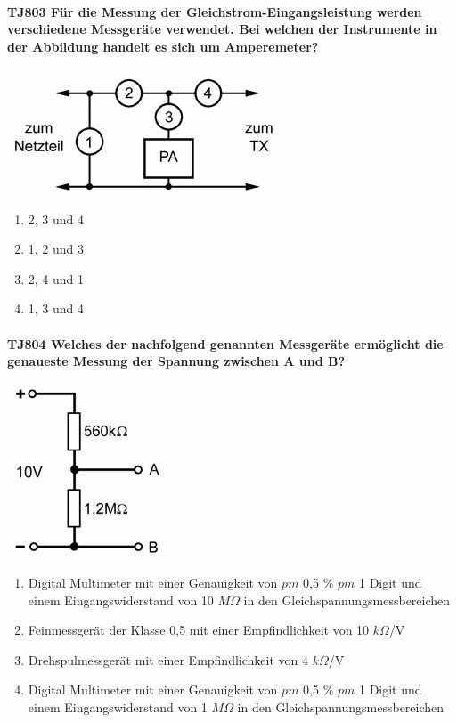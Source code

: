 \documentclass[8pt]{article}
\begin{document}
\paragraph*{TJ803 Für die Messung der Gleichstrom-Eingangsleistung werden verschiedene Messgeräte verwendet. Bei welchen der Instrumente in der Abbildung handelt es sich um Amperemeter?}
\begin{center}
	\begin{minipage}{\linewidth}
		\centering
		\includegraphics[scale=1.0]{pics/tj803_a.jpg}
	\end{minipage}
\end{center}
\begin{enumerate}[nolistsep,label=\Alph*]
\item 2, 3 und 4
\item 1, 2 und 3
\item 2, 4 und 1
\item 1, 3 und 4
\end{enumerate}

\paragraph*{TJ804 Welches der nachfolgend genannten Messgeräte ermöglicht die genaueste Messung der Spannung zwischen A und B?}
\begin{center}
	\begin{minipage}{\linewidth}
		\centering
		\includegraphics[scale=1.0]{pics/tj804_a.jpg}
	\end{minipage}
\end{center}
\begin{enumerate}[nolistsep,label=\Alph*]
\item Digital Multimeter mit einer Genauigkeit von $pm$ 0,5 \% $pm$ 1 Digit und einem Eingangswiderstand von 10 $M\Omega$ in den Gleichspannungsmessbereichen 
\item Feinmessgerät der Klasse 0,5 mit einer Empfindlichkeit von 10 $k\Omega$/V
\item Drehspulmessgerät mit einer Empfindlichkeit von 4 $k\Omega$/V
\item Digital Multimeter mit einer Genauigkeit von $pm$ 0,5 \% $pm$ 1 Digit und einem Eingangswiderstand von 1 $M\Omega$ in den Gleichspannungsmessbereichen 
\end{enumerate}
\end{document}
